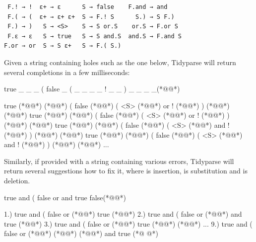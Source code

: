 \documentclass[sigplan,nonacm]{acmart}\settopmatter{printfolios=false,printccs=false,printacmref=false}
\begin{document}
\begin{verbatim}
 F.! → !  ε+ → ε      S → false    F.and → and
 F.( → (  ε+ → ε+ ε+  S → F.! S      S.) → S F.)
 F.) → )   S → <S>    S → S or.S    or.S → F.or S
 F.ε → ε   S → true   S → S and.S  and.S → F.and S
F.or → or  S → S ε+   S → F.( S.)
\end{verbatim}

%

\noindent Given a string containing holes such as the one below, Tidyparse will return several completions in a few milliseconds:

\begin{tidyinput}
true _ _ _ ( false _ ( _ _ _ _ ! _ _ ) _ _ _ _(*@\caret{ }@*)
\end{tidyinput}

\begin{tidyoutput}
true (*@@*) (*@\hlorange{!}@*) ( false (*@@*) ( <S> (*@\hlorange{)}@*) or ! (*@@*) ) (*@@*) (*@@*)
true (*@@*) (*@\hlorange{!}@*) ( false (*@@*) ( <S> (*@\hlorange{)}@*) or ! (*@@*) ) (*@@*) (*@@*)
true (*@@*) (*@\hlorange{!}@*) ( false (*@@*) ( <S> (*@\hlorange{)}@*) and ! (*@@*) ) (*@@*) (*@@*)
true (*@@*) (*@\hlorange{!}@*) ( false (*@@*) ( <S> (*@\hlorange{)}@*) and ! (*@@*) ) (*@@*) (*@@*)
...
\end{tidyoutput}

\noindent Similarly, if provided with a string containing various errors, Tidyparse will return several suggestions how to fix it, where  is insertion,  is substitution and  is deletion.

\begin{tidyinput}
true and ( false or and true false(*@\caret{ }@*)
\end{tidyinput}

\begin{tidyoutput}
1.) true and ( false or (*@\hlorange{!}@*) true (*@\hlorange{)}@*)
2.) true and ( false or (*@@*) and true (*@\hlorange{)}@*)
3.) true and ( false or (*@\hlorange{(}@*) true (*@\hlorange{)}@*) (*@\hlgreen{)}@*)
...
9.) true and ( false or (*@\hlgreen{!}@*) (*@@*) (*@\hlgreen{)}@*) and true (*@ @*)
\end{tidyoutput}
\end{document}

